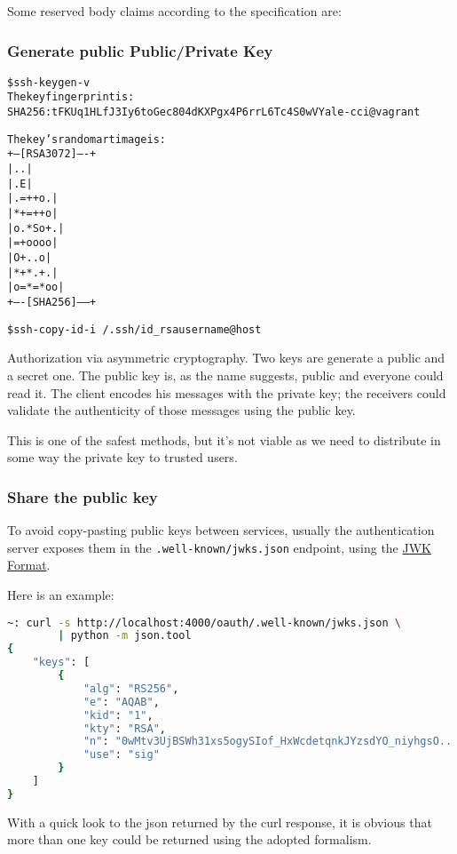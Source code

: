 \documentclass[11pt]{style}
\begin{document}
Some reserved body claims according to the specification are:

\subsubsection{Generate public Public/Private Key}
\begin{alltt}
    \$ ssh-keygen -v
    The key fingerprint is:
    SHA256:tFKUq1HLfJ3Iy6toGec804dKXPgx4P6rrL6Tc4S0wVY ale-cci@vagrant

    The key's randomart image is:
    +---[RSA 3072]----+
    |        ..       |
    |       .E        |
    |     . =++ o .   |
    |      *+=++ o    |
    |     o.*So+.     |
    |      =+oooo     |
    |       O+..o     |
    |      *+*.+ .    |
    |     o=*=*oo     |
    +----[SHA256]-----+


    \$ ssh-copy-id -i ~/.ssh/id_rsa username@host
\end{alltt}
Authorization via asymmetric cryptography. Two keys are generate a public and a secret one.
The public key is, as the name suggests, public and everyone could read it.
The client encodes his messages with the private key; the receivers could validate the authenticity of those messages using the public key.

This is one of the safest methods, but it's not viable as we need to distribute in some way the private key to
trusted users.

\subsubsection{Share the public key}
\label{jwks}
To avoid copy-pasting public keys between services, usually the authentication
server exposes them in the \texttt{.well-known/jwks.json} endpoint, using the
\href{https://tools.ietf.org/html/rfc7517#section-4}{JWK Format}.

Here is an example:

\begin{lstlisting}[language=bash]
~: curl -s http://localhost:4000/oauth/.well-known/jwks.json \
        | python -m json.tool
{
    "keys": [
        {
            "alg": "RS256",
            "e": "AQAB",
            "kid": "1",
            "kty": "RSA",
            "n": "0wMtv3UjBSWh31xs5ogySIof_HxWcdetqnkJYzsdYO_niyhgsO...",
            "use": "sig"
        }
    ]
}
\end{lstlisting}
With a quick look to the json returned by the curl response, it is obvious that
more than one key could be returned using the adopted formalism.
\end{document}
